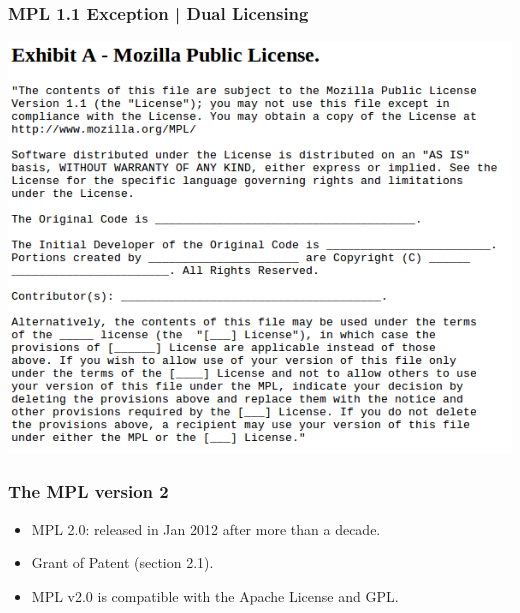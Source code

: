 \documentclass{beamer}
\begin{document}

\begin{frame}
\frametitle{MPL 1.1 Exception | Dual Licensing} 
\begin{center}
\includegraphics[scale=0.40,clip=true]{figs/mpl-exception.png}

\end{center}
\end{frame}



\begin{frame}
\frametitle{The MPL version 2}

\begin{itemize}
\item \alert{MPL 2.0:} released in Jan 2012 after more than a decade.
\item Grant of Patent (section 2.1).
\item MPL v2.0 is \alert{compatible} with the \alert{Apache} License and \alert{GPL}. 
\end{itemize}

\end{frame}


\end{document}
